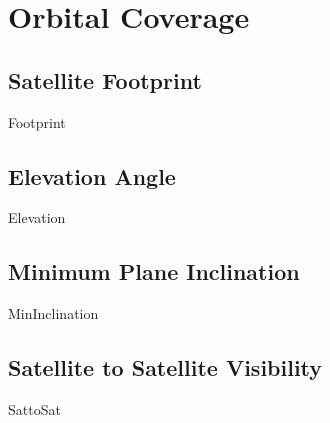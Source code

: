 \chapter{Orbital Coverage}


\section{Satellite Footprint}
{Footprint}

\section{Elevation Angle}
{Elevation}

\section{Minimum Plane Inclination}
{MinInclination}

\section{Satellite to Satellite Visibility}
{SattoSat}

